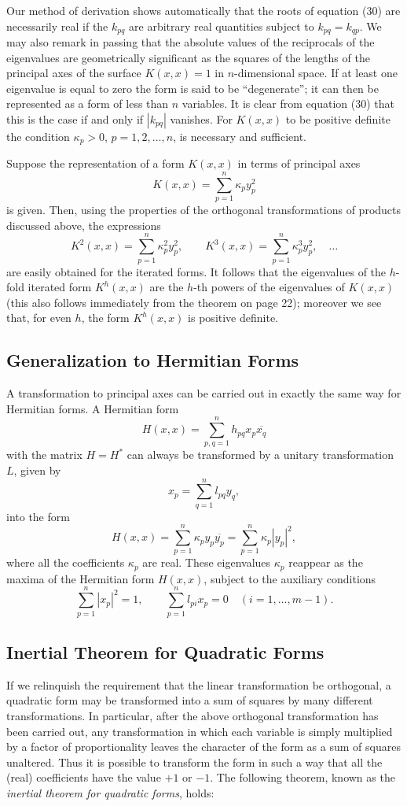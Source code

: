 Our method of derivation shows automatically that the roots of equation (30) are necessarily real if the $k_{pq}$ are arbitrary real quantities subject to $k_{pq}=k_{qp}$. We may also remark in passing that the absolute values of the reciprocals of the eigenvalues are geometrically significant as the squares of the lengths of the principal axes of the surface $K(x,x)=1$ in $n$-dimensional space. If at least one eigenvalue is equal to zero the form is said to be ``degenerate''; it can then be represented as a form of less than $n$ variables. It is clear from equation (30) that this is the case if and only if $|k_{pq}|$ vanishes. For $K(x,x)$ to be positive definite the condition $\kappa_p>0$, $p=1,2,\ldots,n$, is necessary and sufficient.

Suppose the representation of a form $K(x,x)$ in terms of principal axes
\[K(x,x)=\sum_{p=1}^n \kappa_p y_p^2\]
is given. Then, using the properties of the orthogonal transformations of products discussed above, the expressions
\[K^2(x,x)=\sum_{p=1}^n \kappa_p^2y_p^2,\qquad K^3(x,x)=\sum_{p=1}^n \kappa_p^3y_p^2,\quad\ldots\]
are easily obtained for the iterated forms. It follows that the eigenvalues of the $h$-fold iterated form $K^h(x,x)$ are the $h$-th powers of the eigenvalues of $K(x,x)$ (this also follows immediately from the theorem on page 22); moreover we see that, for even $h$, the form $K^h(x,x)$ is positive definite.

\subsection{Generalization to Hermitian Forms}
A transformation to principal axes can be carried out in exactly the same way for Hermitian forms. A Hermitian form
\[H(x,x)=\sum_{p,q=1}^n h_{pq}x_p\overline{x_q}\]
with the matrix $H=H^*$ can always be transformed by a unitary transformation $L$, given by
\[x_p=\sum_{q=1}^n l_{pq}y_q,\]
into the form
\[H(x,x)=\sum_{p=1}^n \kappa_p y_p\overline{y_p}=\sum_{p=1}^n\kappa_p|y_p|^2,\]
where all the coefficients $\kappa_p$ are real. These eigenvalues $\kappa_p$ reappear as the maxima of the Hermitian form $H(x,x)$, subject to the auxiliary conditions
\[\sum_{p=1}^n |x_p|^2=1,\qquad \sum_{p=1}^n l_{pi}x_p=0\quad(i=1,\ldots,m-1).\]

\subsection{Inertial Theorem for Quadratic Forms}
If we relinquish the requirement that the linear transformation be orthogonal, a quadratic form may be transformed into a sum of squares by many different transformations. In particular, after the above orthogonal transformation has been carried out, any transformation in which each variable is simply multiplied by a factor of proportionality leaves the character of the form as a sum of squares unaltered. Thus it is possible to transform the form in such a way that all the (real) coefficients have the value $+1$ or $-1$. The following theorem, known as the \emph{inertial theorem for quadratic forms}, holds:

